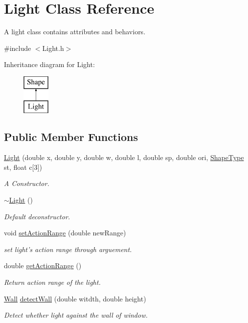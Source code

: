 \hypertarget{classLight}{\section{Light Class Reference}
\label{classLight}
}


A light class contains attributes and behaviors.  




{\ttfamily \#include $<$Light.\-h$>$}

Inheritance diagram for Light\-:\begin{figure}[H]
\begin{center}
\leavevmode
\includegraphics[height=2.000000cm]{classLight}
\end{center}
\end{figure}
\subsection*{Public Member Functions}
\begin{DoxyCompactItemize}
\item 
\hyperlink{classLight_a1e4797b7ed1488b6d6990489f5434c34}{Light} (double x, double y, double w, double l, double sp, double ori, \hyperlink{Shape_8h_a5a4538eeab397888d88a4eefcc5a1345}{Shape\-Type} st, float c\mbox{[}3\mbox{]})
\begin{DoxyCompactList}\small\item\em A Constructor. \end{DoxyCompactList}\item 
\hyperlink{classLight_ad0e59fad13bb6cfadc25b2c477e9ddc7}{$\sim$\-Light} ()
\begin{DoxyCompactList}\small\item\em Default deconstructor. \end{DoxyCompactList}\item 
void \hyperlink{classLight_ac9e3a10f4413cdd83325397e38cd2dbe}{set\-Action\-Range} (double new\-Range)
\begin{DoxyCompactList}\small\item\em set light's action range through arguement. \end{DoxyCompactList}\item 
double \hyperlink{classLight_afe69e219ba4af853ad17408b50147cfe}{get\-Action\-Range} ()
\begin{DoxyCompactList}\small\item\em Return action range of the light. \end{DoxyCompactList}\item 
\hyperlink{Shape_8h_ad4f6886266572e51d198a61a6c762ce5}{Wall} \hyperlink{classLight_a47adb475bd05d17248c28c62c41dbc8a}{detect\-Wall} (double witdth, double height)
\begin{DoxyCompactList}\small\item\em Detect whether light against the wall of window. \end{DoxyCompactList}\end{DoxyCompactItemize}
